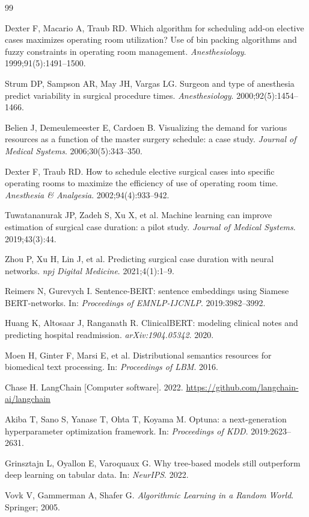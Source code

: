 \documentclass[11pt,twocolumn]{article}
\begin{document}
\clearpage
\twocolumn

\begin{thebibliography}{99}

Dexter F, Macario A, Traub RD.
Which algorithm for scheduling add-on elective cases maximizes operating room
utilization? Use of bin packing algorithms and fuzzy constraints in operating
room management.
\textit{Anesthesiology}. 1999;91(5):1491--1500.

Strum DP, Sampson AR, May JH, Vargas LG.
Surgeon and type of anesthesia predict variability in surgical procedure times.
\textit{Anesthesiology}. 2000;92(5):1454--1466.

Belien J, Demeulemeester E, Cardoen B.
Visualizing the demand for various resources as a function of the master surgery
schedule: a case study.
\textit{Journal of Medical Systems}. 2006;30(5):343--350.

Dexter F, Traub RD.
How to schedule elective surgical cases into specific operating rooms to maximize
the efficiency of use of operating room time.
\textit{Anesthesia \& Analgesia}. 2002;94(4):933--942.

Tuwatananurak JP, Zadeh S, Xu X, et al.
Machine learning can improve estimation of surgical case duration: a pilot study.
\textit{Journal of Medical Systems}. 2019;43(3):44.

Zhou P, Xu H, Lin J, et al.
Predicting surgical case duration with neural networks.
\textit{npj Digital Medicine}. 2021;4(1):1--9.

Reimers N, Gurevych I.
Sentence-BERT: sentence embeddings using Siamese BERT-networks.
In: \textit{Proceedings of EMNLP-IJCNLP}. 2019:3982--3992.

Huang K, Altosaar J, Ranganath R.
ClinicalBERT: modeling clinical notes and predicting hospital readmission.
\textit{arXiv:1904.05342}. 2020.

Moen H, Ginter F, Marsi E, et al.
Distributional semantics resources for biomedical text processing.
In: \textit{Proceedings of LBM}. 2016.

Chase H.
LangChain [Computer software]. 2022.
\url{https://github.com/langchain-ai/langchain}

Akiba T, Sano S, Yanase T, Ohta T, Koyama M.
Optuna: a next-generation hyperparameter optimization framework.
In: \textit{Proceedings of KDD}. 2019:2623--2631.

Grinsztajn L, Oyallon E, Varoquaux G.
Why tree-based models still outperform deep learning on tabular data.
In: \textit{NeurIPS}. 2022.

Vovk V, Gammerman A, Shafer G.
\textit{Algorithmic Learning in a Random World}.
Springer; 2005.

\end{thebibliography}
\end{document}
